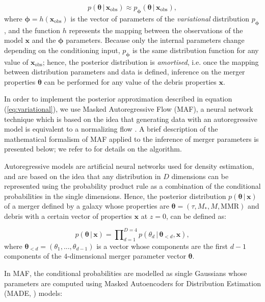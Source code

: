 \begin{equation}
    p(\bm{\theta} \, | \, \bm{x_{\mathrm{obs}}} )\approx p_{\bm{\phi}}(\bm{\theta}\, |\, \bm{x_{\mathrm{obs}}}),  
\label{eq:variational}
\end{equation}
where $\bm{\phi}=h(\bm{x_{\mathrm{obs}}})$ is the vector of parameters of the \textit{variational} distribution $p_{\bm{\phi}}$, and the function $h$ represents the mapping between the observations of the model $\bm{x}$ and the $\bm{\phi}$ parameters. Because only the internal parameters change depending on the conditioning input, $p_{\bm{\phi}}$ is the same distribution function for any value of $\bm{x_{\mathrm{obs}}}$; hence, the posterior distribution is \textit{amortised}, i.e. once the mapping between distribution parameters and data is defined, inference on the merger properties $\bm{\theta}$ can be performed for any value of the debris properties $\bm{x}$. 

In order to implement the posterior approximation described in equation (\ref{eq:variational}), we use Masked Autoregressive Flow (MAF), a neural network technique which is based on the idea that generating data with an autoregressive model is equivalent to a normalizing flow \citep{Kingma2016}. A brief description of the mathematical formalism of MAF applied to the inference of merger parameters is presented below; we refer to \cite{Papamakarios2017} for details on the algorithm. 

Autoregressive models \citep{Uria2016} are artificial neural networks used for density estimation, and are based on the idea that any distribution in $D$ dimensions can be represented using the probability product rule as a combination of the conditional probabilities in the single dimensions. Hence, the posterior distribution $p(\bm{\theta} \, | \, \bm{x} )$ of a merger defined by a galaxy whose properties are $\bm{\theta}=(\tau, M_*, M,\mathrm{MMR})$ and debris with a certain vector of properties $\bm{x}$ at $z=0$, can be defined as:

\begin{equation}
    p(\bm{\theta} \, | \, \bm{x} ) = \bm{\prod}_{d=1}^{D=4} p(\theta_{d} \, | \, \bm{\theta}_{<d} , \bm{x}),
\end{equation}
where $\bm{\theta}_{<d} = (\theta_1, ..., \theta_{d-1})$ is a vector whose components are the first $d-1$ components of the $4$-dimensional merger parameter vector $\bm{\theta}$. 

In MAF, the conditional probabilities are modelled as single Gaussians whose parameters are computed using Masked Autoencoders for Distribution Estimation (MADE, \citealt{Germain2015}) models:


